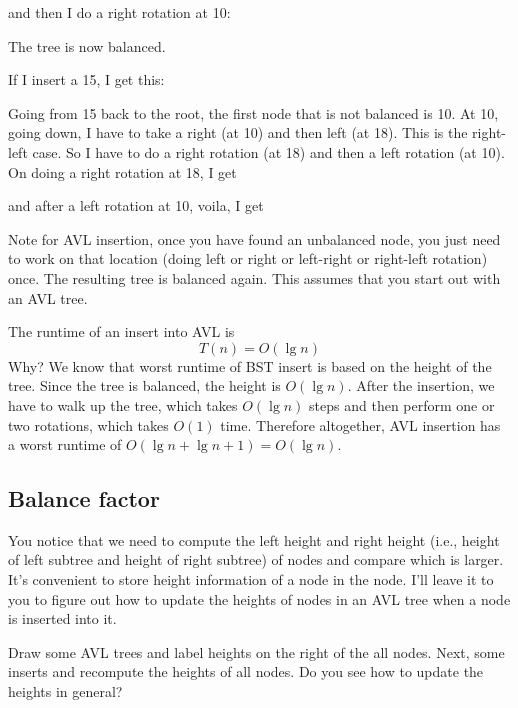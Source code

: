 

and then I do a right rotation at 10:



The tree is now balanced.

If I insert a 15, I get this:



Going from 15 back to the root, the first node that is not balanced is 10.
At 10, going down, I have to take a right (at 10) and then left (at 18).
This is the right-left case.
So I have to do a right rotation (at 18) and then a left rotation (at 10).
On doing a right rotation at 18, I get



and after a left rotation at 10, voila, I get



Note for AVL insertion, once you have found an unbalanced node,
you just need to work on that location (doing left or right or left-right or
right-left rotation) once.
The resulting tree is balanced again.
This assumes that you start out with an AVL tree.

The runtime of an insert into AVL is
\[
T(n) = O(\lg n)
\]
Why?
We know that worst runtime of BST insert is based on the height of the
tree.
Since the tree is balanced, the height is $O(\lg n)$.
After the insertion, we have to walk up the tree, which takes $O(\lg n)$ steps
and then perform one or two rotations, which takes $O(1)$ time.
Therefore altogether, AVL insertion has a worst runtime of $O(\lg n + \lg n + 1) =
O(\lg n)$.


\newpage
\subsection{Balance factor}

You notice that we need to compute the left height and right height
(i.e., height of
left subtree and height of right subtree) of nodes and compare which is larger.
It's convenient to store height information of a node
in the node.
I'll leave it to you to figure out how to update the heights of nodes in an
AVL tree when a node is inserted into it.



\newpage
\begin{ex}
Draw some AVL trees and label heights on the right of the all nodes.
Next, some inserts and recompute the heights of all nodes.
Do you see how to update the heights in general?
\end{ex}



